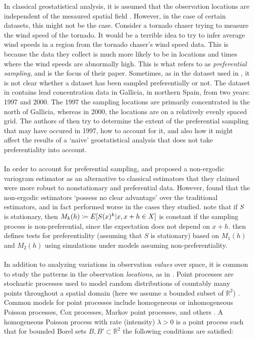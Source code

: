 \documentclass{uwstat572}
\begin{document}
In classical geostatistical analysis, it is assumed that the observation locations are independent of the mesaured spatial field \citep{diggle2010}.  However, in the case of certain datasets, this might not be the case.  Consider a tornado chaser trying to measure the wind speed of the tornado.  It would be a terrible idea to try to infer average wind speeds in a region from the tornado chaser's wind speed data.  This is because the data they collect is much more likely to be in locations and times where the wind speeds are abnormally high.  This is what \citet{diggle2010} refers to as \emph{preferential sampling}, and is the focus of their paper.  Sometimes, as in the dataset used in \citet{diggle2010}, it is not clear whether a dataset has been sampled preferentially or not.  The dataset in \citet{diggle2010} contains lead concentration data in Gallicia, in northern Spain, from two years: 1997 and 2000.  The 1997 the sampling locations are primarily concentrated in the north of Gallicia, whereas in 2000, the locations are on a relatively evenly spaced grid.  The authors of \cite{diggle2010} then try to determine the extent of the preferential sampling that may have occured in 1997, how to account for it, and also how it might affect the results of a `naive' geostatistical analysis that does not take preferentiality into account.
\\\\
In order to account for preferential sampling, \citet{isaaks1988} and \citet{srivastava1989} proposed a non-ergodic variogram estimator as an alternative to classical estimators that they claimed were more robust to nonstationary and preferential data.  However, \citet{curriero2002} found that the non-ergodic estimators `possess no clear advantage' over the traditional estimators, and in fact performed worse in the cases they studied.  \citet{schlather2004} note that if $S$ is stationary, then $M_k(h) \coloneqq E[S(x)^k \vert x, x+h \in X]$ is constant if the sampling process is non-preferential, since the expectation does not depend on $x+h$.  \citet{schlather2004} then defines tests for preferentiality (assuming that $S$ is stationary) based on $M_1(h)$ and $M_2(h)$ using simulations under models assuming non-preferentiality.
\\\\
In addition to analyzing variations in observation \emph{values} over space, it is common to study the patterns in the observation \emph{locations}, as in \citet{diggle2010}.  Point processes are stochastic processes used to model random distributions of countably many points throughout a spatial domain (here we assume a bounded subset of $\mathbb{R}^2$) \citep{handbook}.  Common models for point processes include homogeneous or inhomogeneous Poisson processes, Cox processes, Markov point processes, and others \citep{handbook}.  A homogeneous Poisson process with rate (intensity) $\lambda > 0$ is a point process such that for bounded Borel sets $B, B' \subset \mathbb{R}^2$ the following conditions are satisfied:
\end{document}
